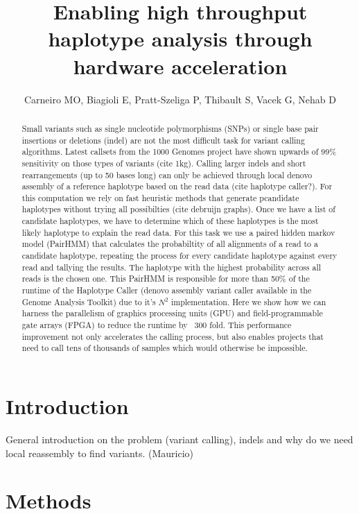 \documentclass[11pt, oneside]{article}
\title{Enabling high throughput haplotype analysis through hardware acceleration}
\author{Carneiro MO, Biagioli E, Pratt-Szeliga P, Thibault S, Vacek G, Nehab D}
\begin{document}
 \maketitle
	
	\begin{abstract} 
	
	Small variants such as single nucleotide polymorphisms (SNPs) or single base
	pair insertions or deletions (indel) are not the most difficult task for
	variant calling algorithms. Latest callsets from the 1000 Genomes project
	have shown upwards of 99\% sensitivity on those types of variants (cite
	1kg). Calling larger indels and short rearrangements (up to 50 bases
	long) can only be achieved through local denovo assembly of a
	reference haplotype based on the read data (cite haplotype caller?).
	For this computation we rely on fast heuristic methods that generate
	pcandidate haplotypes without trying all possibilties (cite debruijn
	graphs). Once we have a list of candidate haplotypes, we
	have to determine which of these haplotypes is the most likely
	haplotype to explain the read data. For this task we use a paired
	hidden markov model (PairHMM) that calculates the probabiltity of
	all alignments of a read to a candidate haplotype, repeating the
	process for every candidate haplotype against every read and
	tallying the results. The haplotype with the highest probability
	across all reads is the chosen one. This PairHMM is responsible for
	more than 50\% of the runtime of the Haplotype Caller (denovo
	assembly variant caller available in the Genome Analysis
	Toolkit) due to it's $N^2$ implementation. Here we show how
	we can harness the parallelism of graphics processing units (GPU)
	and field-programmable gate arrays (FPGA) to reduce the runtime by ~300
	fold. This performance improvement not only accelerates the calling process,
	but also enables projects that need to call tens of thousands of samples
	which would otherwise be impossible.  
	
	\end{abstract}

	\section{Introduction} 
	
	General introduction on the problem (variant calling), indels and why do we need local reassembly to find variants. (Mauricio) 
	
	\section{Methods} 
	
\end{document}
